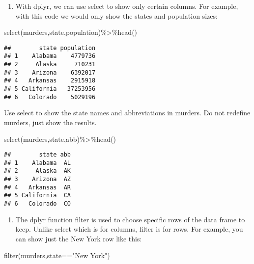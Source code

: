 \documentclass[
]{article}
\newenvironment{Shaded}{\begin{snugshade}}{\end{snugshade}}
\newcommand{\FunctionTok}[1]{\textcolor[rgb]{0.00,0.00,0.00}{#1}}
\newcommand{\NormalTok}[1]{#1}
\newcommand{\SpecialCharTok}[1]{\textcolor[rgb]{0.00,0.00,0.00}{#1}}
\newcommand{\StringTok}[1]{\textcolor[rgb]{0.31,0.60,0.02}{#1}}
\providecommand{\tightlist}{%
  \setlength{\itemsep}{0pt}\setlength{\parskip}{0pt}}
\begin{document}
\begin{enumerate}
\def\labelenumi{\arabic{enumi}.}
\setcounter{enumi}{2}
\tightlist
\item
  With dplyr, we can use select to show only certain columns. For
  example, with this code we would only show the states and population
  sizes:
\end{enumerate}

\begin{Shaded}
\begin{Highlighting}[]
\FunctionTok{select}\NormalTok{(murders,state,population)}\SpecialCharTok{\%\textgreater{}\%}\FunctionTok{head}\NormalTok{()}
\end{Highlighting}
\end{Shaded}

\begin{verbatim}
##        state population
## 1    Alabama    4779736
## 2     Alaska     710231
## 3    Arizona    6392017
## 4   Arkansas    2915918
## 5 California   37253956
## 6   Colorado    5029196
\end{verbatim}

Use select to show the state names and abbreviations in murders. Do not
redefine murders, just show the results.

\begin{Shaded}
\begin{Highlighting}[]
\FunctionTok{select}\NormalTok{(murders,state,abb)}\SpecialCharTok{\%\textgreater{}\%}\FunctionTok{head}\NormalTok{()}
\end{Highlighting}
\end{Shaded}

\begin{verbatim}
##        state abb
## 1    Alabama  AL
## 2     Alaska  AK
## 3    Arizona  AZ
## 4   Arkansas  AR
## 5 California  CA
## 6   Colorado  CO
\end{verbatim}

\begin{enumerate}
\def\labelenumi{\arabic{enumi}.}
\setcounter{enumi}{3}
\tightlist
\item
  The dplyr function filter is used to choose specific rows of the data
  frame to keep. Unlike select which is for columns, filter is for rows.
  For example, you can show just the New York row like this:
\end{enumerate}

\begin{Shaded}
\begin{Highlighting}[]
\FunctionTok{filter}\NormalTok{(murders,state}\SpecialCharTok{==}\StringTok{"New York"}\NormalTok{)}
\end{Highlighting}
\end{Shaded}
\end{document}
